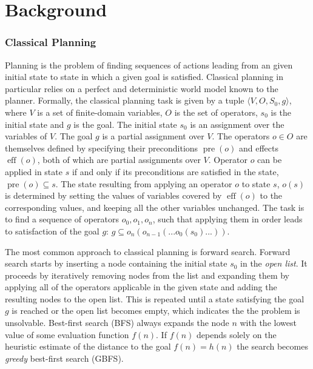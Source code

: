 \documentclass[letterpaper]{article} %
\begin{document}
\section{Background}

\subsubsection{Classical Planning} Planning is the problem of finding sequences of actions leading from an given initial state to state in which a given goal is satisfied. Classical planning in particular relies on a perfect and deterministic world model known to the planner. Formally, the classical planning task is given by a tuple $\langle V,O,S_0,g\rangle$, where $V$ is a set of finite-domain variables, $O$ is the set of operators, $s_0$ is the initial state and $g$ is the goal. The initial state $s_0$ is an assignment over the variables of $V$. The goal $g$ is a partial assignment over $V$. The operators $o \in O$ are themselves defined by specifying their preconditions $\operatorname{pre}(o)$ and effects $\operatorname{eff}(o)$, both of which are partial assignments over $V$. Operator $o$ can be applied in state $s$ if and only if its preconditions are satisfied in the state, $\operatorname{pre}(o) \subseteq s$. The state resulting from applying an operator $o$ to state $s$, $o(s)$ is determined by setting the values of variables covered by $\operatorname{eff}(o)$ to the corresponding values, and keeping all the other variables unchanged. The task is to find a sequence of operators $o_0, o_1, o_n$, such that applying them in order leads to satisfaction of the goal $g$: $g \subseteq o_n(o_{n-1}(...o_0(s_0)...))$.

The most common approach to classical planning is forward search. Forward search starts by inserting a node containing the initial state $s_0$ in the \emph{open list}. It proceeds by iteratively removing nodes from the list and expanding them by applying all of the operators applicable in the given state and adding the resulting nodes to the open list. This is repeated until a state satisfying the goal $g$ is reached or the open list becomes empty, which indicates the the problem is unsolvable. Best-first search (BFS) always expands the node $n$ with the lowest value of some evaluation function $f(n)$. If $f(n)$ depends solely on the heuristic estimate of the distance to the goal $f(n)=h(n)$ the search becomes \emph{greedy} best-first search (GBFS).
\end{document}
